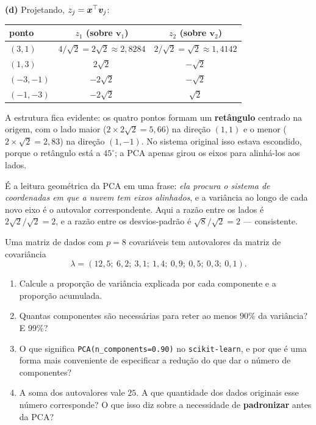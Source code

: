 \documentclass[11pt,a4paper]{article}
\begin{document}
\begin{solucao}
\smallskip
\textbf{(d)} Projetando, $z_j = \bm{x}^\top\bm v_j$:
\begin{center}\small
\renewcommand{\arraystretch}{1.25}
\begin{tabular}{@{}lcc@{}}
\toprule
ponto & $z_1$ (sobre $\bm v_1$) & $z_2$ (sobre $\bm v_2$) \\
\midrule
$(3,1)$   & $4/\sqrt2 = 2\sqrt2 \approx 2{,}8284$ & $2/\sqrt2 = \sqrt2 \approx 1{,}4142$ \\
$(1,3)$   & $2\sqrt2$   & $-\sqrt2$ \\
$(-3,-1)$ & $-2\sqrt2$  & $-\sqrt2$ \\
$(-1,-3)$ & $-2\sqrt2$  & $\sqrt2$ \\
\bottomrule
\end{tabular}
\end{center}
A estrutura fica evidente: os quatro pontos formam um \textbf{retângulo}
centrado na origem, com o lado maior ($2\times 2\sqrt2 = 5{,}66$) na direção
$(1,1)$ e o menor ($2\times\sqrt2 = 2{,}83$) na direção $(1,-1)$. No sistema
original isso estava escondido, porque o retângulo está a $45^\circ$; a PCA
apenas girou os eixos para alinhá-los aos lados.

É a leitura geométrica da PCA em uma frase: \emph{ela procura o sistema de
coordenadas em que a nuvem tem eixos alinhados}, e a variância ao longo de cada
novo eixo é o autovalor correspondente. Aqui a razão entre os lados é
$2\sqrt2/\sqrt2 = 2$, e a razão entre os desvios-padrão é
$\sqrt{8}/\sqrt{2}=2$ --- consistente.
\end{solucao}

\begin{exercicio}
Uma matriz de dados com $p=8$ covariáveis tem autovalores da matriz de
covariância
\[
  \lambda = (12{,}5;\ 6{,}2;\ 3{,}1;\ 1{,}4;\ 0{,}9;\ 0{,}5;\ 0{,}3;\ 0{,}1).
\]
\begin{enumerate}[label=(\alph*),leftmargin=1.1cm]
  \item Calcule a proporção de variância explicada por cada componente e a
        proporção acumulada.
  \item Quantas componentes são necessárias para reter ao menos $90\%$ da
        variância? E $99\%$?
  \item O que significa \texttt{PCA(n\_components=0.90)} no
        \texttt{scikit-learn}, e por que é uma forma mais conveniente de
        especificar a redução do que dar o número de componentes?
  \item A soma dos autovalores vale $25$. A que quantidade dos dados originais
        esse número corresponde? O que isso diz sobre a necessidade de
        \textbf{padronizar} antes da PCA?
\end{enumerate}
\end{exercicio}
\end{document}
